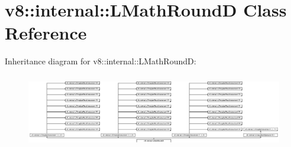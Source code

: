 \hypertarget{classv8_1_1internal_1_1_l_math_round_d}{}\section{v8\+:\+:internal\+:\+:L\+Math\+RoundD Class Reference}
\label{classv8_1_1internal_1_1_l_math_round_d}
Inheritance diagram for v8\+:\+:internal\+:\+:L\+Math\+RoundD\+:\begin{figure}[H]
\begin{center}
\leavevmode
\includegraphics[height=3.271375cm]{classv8_1_1internal_1_1_l_math_round_d}
\end{center}
\end{figure}
